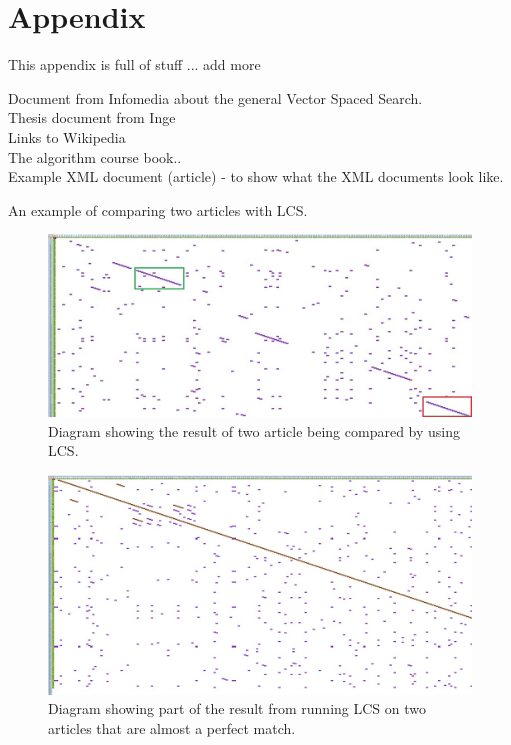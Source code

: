 \chapter{Appendix}

This appendix is full of stuff ... add more

Document from Infomedia about the general Vector Spaced Search.\\
Thesis document from Inge\\
Links to Wikipedia\\
The algorithm course book..\\
Example XML document (article) - to show what the XML documents look like.

An example of comparing two articles with LCS.

\begin{figure}
	\includegraphics[scale=0.65]{figures/LcsExample}
	\caption{Diagram showing the result of two article being compared by using LCS.}
\end{figure}

\begin{figure}
	\includegraphics[scale=0.5]{figures/PerfectMatch}
	\caption{Diagram showing part of the result from running LCS on two articles that are almost a perfect match.}
\end{figure}

